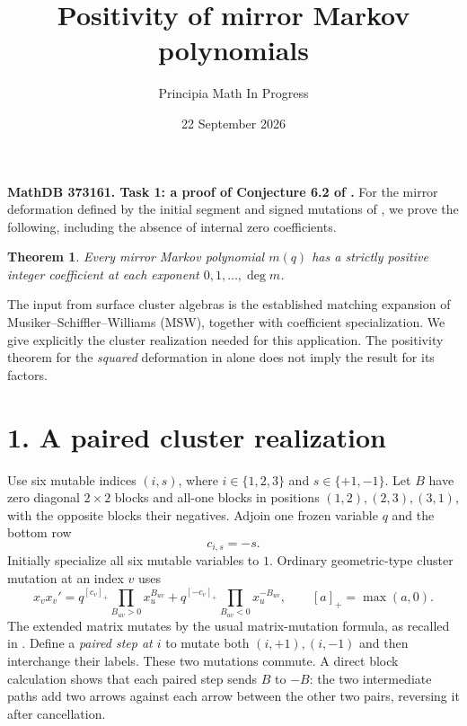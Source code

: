 \documentclass[11pt]{article}
\title{Positivity of mirror Markov polynomials}
\author{Principia Math In Progress}
\date{22 September 2026}
\newtheorem{theorem}{Theorem}
\newcommand{\pos}[1]{[#1]_+}
\begin{document}
\maketitle
\noindent\textbf{MathDB 373161. Task 1: a proof of Conjecture 6.2 of \cite{mirror}.}
For the mirror deformation defined by the initial segment and signed mutations
of \cite[Definitions 4.1--4.2]{mirror}, we prove the following, including the
absence of internal zero coefficients.
\begin{theorem}\label{main}
Every mirror Markov polynomial $m(q)$ has a strictly positive integer coefficient
at each exponent $0,1,\ldots,\deg m$.
\end{theorem}
The input from surface cluster algebras is the established matching expansion
of Musiker--Schiffler--Williams (MSW), together with coefficient specialization.
We give explicitly the cluster realization needed for this application. The
positivity theorem for the \emph{squared} deformation in \cite{mirror} alone
does not imply the result for its factors.

\section*{1. A paired cluster realization}
Use six mutable indices $(i,s)$, where $i\in\{1,2,3\}$ and
$s\in\{+1,-1\}$. Let $B$ have zero diagonal $2\times2$ blocks and all-one
blocks in positions $(1,2),(2,3),(3,1)$, with the opposite blocks their
negatives. Adjoin one frozen variable $q$ and the bottom row
\[
 c_{i,s}=-s. \tag{1}
\]
Initially specialize all six mutable variables to $1$. Ordinary geometric-type
cluster mutation at an index $v$ uses
\[
 x_vx_v'=q^{\pos{c_v}}\prod_{B_{uv}>0}x_u^{B_{uv}}
             +q^{\pos{-c_v}}\prod_{B_{uv}<0}x_u^{-B_{uv}},\qquad
 [a]_+=\max(a,0). \tag{2}
\]
The extended matrix mutates by the usual matrix-mutation formula, as recalled
in \cite[Section 2]{msw}. Define a \emph{paired step at $i$} to mutate both
$(i,+1),(i,-1)$ and then interchange their labels. These two mutations commute.
A direct block calculation shows that each paired step sends $B$ to $-B$:
the two intermediate paths add two arrows against each arrow between the
other two pairs, reversing it after cancellation.
\end{document}

